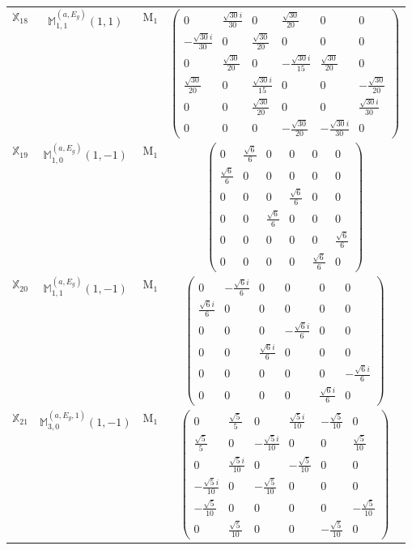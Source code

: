 \documentclass[fleqn,10pt,landscape]{article}
\begin{document}
\begin{itemize}
\begin{center}
\begin{longtable}{c|c|c|c}
$ \mathbb{X}_{18} $ & $\mathbb{M}_{1,1}^{(a,E_{g})}(1,1)$ & M$_{1}$ & $\begin{pmatrix} 0 & \frac{\sqrt{30} i}{30} & 0 & \frac{\sqrt{30}}{20} & 0 & 0 \\ - \frac{\sqrt{30} i}{30} & 0 & \frac{\sqrt{30}}{20} & 0 & 0 & 0 \\ 0 & \frac{\sqrt{30}}{20} & 0 & - \frac{\sqrt{30} i}{15} & \frac{\sqrt{30}}{20} & 0 \\ \frac{\sqrt{30}}{20} & 0 & \frac{\sqrt{30} i}{15} & 0 & 0 & - \frac{\sqrt{30}}{20} \\ 0 & 0 & \frac{\sqrt{30}}{20} & 0 & 0 & \frac{\sqrt{30} i}{30} \\ 0 & 0 & 0 & - \frac{\sqrt{30}}{20} & - \frac{\sqrt{30} i}{30} & 0 \end{pmatrix}$ \\
$ \mathbb{X}_{19} $ & $\mathbb{M}_{1,0}^{(a,E_{g})}(1,-1)$ & M$_{1}$ & $\begin{pmatrix} 0 & \frac{\sqrt{6}}{6} & 0 & 0 & 0 & 0 \\ \frac{\sqrt{6}}{6} & 0 & 0 & 0 & 0 & 0 \\ 0 & 0 & 0 & \frac{\sqrt{6}}{6} & 0 & 0 \\ 0 & 0 & \frac{\sqrt{6}}{6} & 0 & 0 & 0 \\ 0 & 0 & 0 & 0 & 0 & \frac{\sqrt{6}}{6} \\ 0 & 0 & 0 & 0 & \frac{\sqrt{6}}{6} & 0 \end{pmatrix}$ \\
$ \mathbb{X}_{20} $ & $\mathbb{M}_{1,1}^{(a,E_{g})}(1,-1)$ & M$_{1}$ & $\begin{pmatrix} 0 & - \frac{\sqrt{6} i}{6} & 0 & 0 & 0 & 0 \\ \frac{\sqrt{6} i}{6} & 0 & 0 & 0 & 0 & 0 \\ 0 & 0 & 0 & - \frac{\sqrt{6} i}{6} & 0 & 0 \\ 0 & 0 & \frac{\sqrt{6} i}{6} & 0 & 0 & 0 \\ 0 & 0 & 0 & 0 & 0 & - \frac{\sqrt{6} i}{6} \\ 0 & 0 & 0 & 0 & \frac{\sqrt{6} i}{6} & 0 \end{pmatrix}$ \\
$ \mathbb{X}_{21} $ & $\mathbb{M}_{3,0}^{(a,E_{g},1)}(1,-1)$ & M$_{1}$ & $\begin{pmatrix} 0 & \frac{\sqrt{5}}{5} & 0 & \frac{\sqrt{5} i}{10} & - \frac{\sqrt{5}}{10} & 0 \\ \frac{\sqrt{5}}{5} & 0 & - \frac{\sqrt{5} i}{10} & 0 & 0 & \frac{\sqrt{5}}{10} \\ 0 & \frac{\sqrt{5} i}{10} & 0 & - \frac{\sqrt{5}}{10} & 0 & 0 \\ - \frac{\sqrt{5} i}{10} & 0 & - \frac{\sqrt{5}}{10} & 0 & 0 & 0 \\ - \frac{\sqrt{5}}{10} & 0 & 0 & 0 & 0 & - \frac{\sqrt{5}}{10} \\ 0 & \frac{\sqrt{5}}{10} & 0 & 0 & - \frac{\sqrt{5}}{10} & 0 \end{pmatrix}$ \\

\end{longtable}
\end{center}
\end{itemize}
\end{document}

